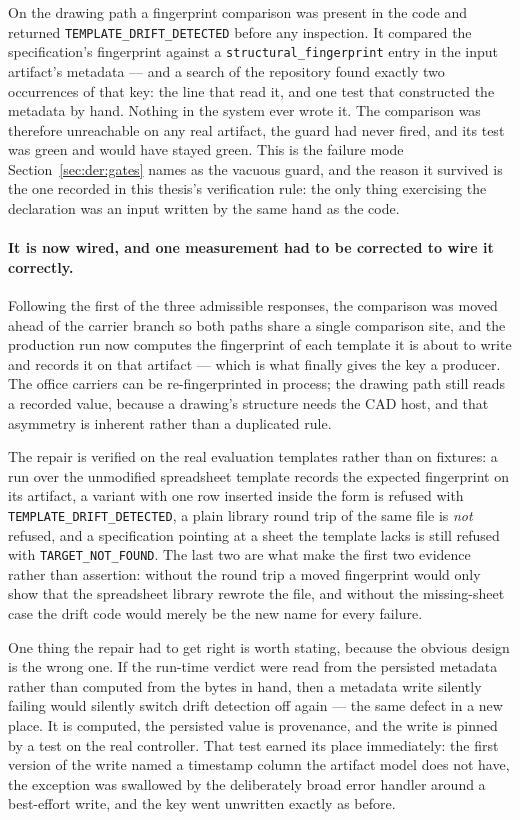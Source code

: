 On the drawing path a fingerprint comparison was present in the code and returned
\texttt{TEMPLATE\_DRIFT\_DETECTED} before any inspection. It compared the specification's
fingerprint against a \texttt{structural\_fingerprint} entry in the input artifact's metadata
--- and a search of the repository found exactly two occurrences of that key: the line that
read it, and one test that constructed the metadata by hand. Nothing in the system ever wrote
it. The comparison was therefore unreachable on any real artifact, the guard had never fired,
and its test was green and would have stayed green. This is the failure mode
Section~\ref{sec:der:gates} names as the vacuous guard, and the reason it survived is the one
recorded in this thesis's verification rule: the only thing exercising the declaration was an
input written by the same hand as the code.

\paragraph{It is now wired, and one measurement had to be corrected to wire it correctly.}
Following the first of the three admissible responses, the comparison was moved ahead of the
carrier branch so both paths share a single comparison site, and the production run now
computes the fingerprint of each template it is about to write and records it on that
artifact --- which is what finally gives the key a producer. The office carriers can be
re-fingerprinted in process; the drawing path still reads a recorded value, because a
drawing's structure needs the CAD host, and that asymmetry is inherent rather than a
duplicated rule.

The repair is verified on the real evaluation templates rather than on fixtures: a run over
the unmodified spreadsheet template records the expected fingerprint on its artifact, a
variant with one row inserted inside the form is refused with
\texttt{TEMPLATE\_DRIFT\_DETECTED}, a plain library round trip of the same file is
\emph{not} refused, and a specification pointing at a sheet the template lacks is still
refused with \texttt{TARGET\_NOT\_FOUND}. The last two are what make the first two evidence
rather than assertion: without the round trip a moved fingerprint would only show that the
spreadsheet library rewrote the file, and without the missing-sheet case the drift code would
merely be the new name for every failure.

One thing the repair had to get right is worth stating, because the obvious design is the
wrong one. If the run-time verdict were read from the persisted metadata rather than computed
from the bytes in hand, then a metadata write silently failing would silently switch drift
detection off again --- the same defect in a new place. It is computed, the persisted value is
provenance, and the write is pinned by a test on the real controller. That test earned its
place immediately: the first version of the write named a timestamp column the artifact model
does not have, the exception was swallowed by the deliberately broad error handler around a
best-effort write, and the key went unwritten exactly as before.

